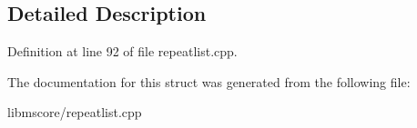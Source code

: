 \subsection{Detailed Description}


Definition at line 92 of file repeatlist.\+cpp.



The documentation for this struct was generated from the following file\+:\begin{DoxyCompactItemize}
\item 
libmscore/repeatlist.\+cpp\end{DoxyCompactItemize}
